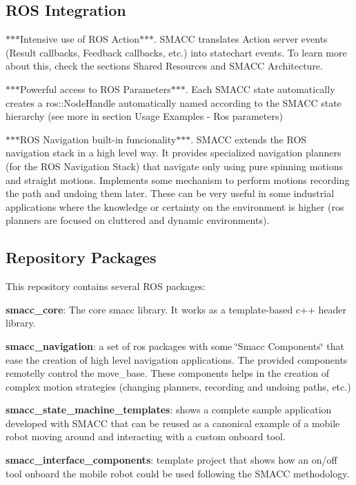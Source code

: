 \subsection*{R\+OS Integration}


\begin{DoxyItemize}
\item $\ast$$\ast$$\ast$\+Intensive use of R\+OS Action$\ast$$\ast$$\ast$. S\+M\+A\+CC translates Action server events (Result callbacks, Feedback callbacks, etc.) into statechart events. To learn more about this, check the sections Shared Resources and S\+M\+A\+CC Architecture.
\item $\ast$$\ast$$\ast$\+Powerful access to R\+OS Parameters$\ast$$\ast$$\ast$. Each S\+M\+A\+CC state automatically creates a ros\+::\+Node\+Handle automatically named according to the S\+M\+A\+CC state hierarchy (see more in section Usage Examples -\/ Ros parameters)
\item $\ast$$\ast$$\ast$\+R\+OS Navigation built-\/in funcionality$\ast$$\ast$$\ast$. S\+M\+A\+CC extends the R\+OS navigation stack in a high level way. It provides specialized navigation planners (for the R\+OS Navigation Stack) that navigate only using pure spinning motions and straight motions. Implements some mechanism to perform motions recording the path and undoing them later. These can be very useful in some industrial applications where the knowledge or certainty on the environment is higher (ros planners are focused on cluttered and dynamic environments).
\end{DoxyItemize}

\subsection*{Repository Packages}

This repository contains several R\+OS packages\+:


\begin{DoxyItemize}
\item {\bfseries smacc\+\_\+core}\+: The core smacc library. It works as a template-\/based c++ header library.
\item {\bfseries smacc\+\_\+navigation}\+: a set of ros packages with some \char`\"{}\+Smacc Components\char`\"{} that ease the creation of high level navigation applications. The provided components remotelly control the move\+\_\+base. These components helps in the creation of complex motion strategies (changing planners, recording and undoing paths, etc.)
\item {\bfseries smacc\+\_\+state\+\_\+machine\+\_\+templates}\+: shows a complete sample application developed with S\+M\+A\+CC that can be reused as a canonical example of a mobile robot moving around and interacting with a custom onboard tool.
\item {\bfseries smacc\+\_\+interface\+\_\+components}\+: template project that shows how an on/off tool onboard the mobile robot could be used following the S\+M\+A\+CC methodology.
\end{DoxyItemize}

